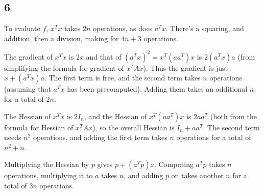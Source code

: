 \documentclass{article}
\begin{document}
\subsection*{6}
To evaluate $f$, $x^Tx$ takes $2n$ operations, as does $a^Tx$. There's a squaring, and addition, then a division, making for $4n+3$ operations.

The gradient of $x^Tx$ is $2x$ and that of $(a^Tx)^2=x^T(aa^T)x$ is $2(a^Tx)a$ (from simplifying the formula for gradient of $x^TAx$). Thus the gradient is just $x+(a^Tx)a$. The first term is free, and the second term takes $n$ operations (assuming that $a^Tx$ has been precomputed). Adding them takes an additional $n$, for a total of $2n$.

The Hessian of $x^Tx$ is $2I_n$, and the Hessian of $x^T(aa^T)x$ is $2aa^T$ (both from the formula for Hessian of $x^TAx$), so the overall Hessian is $I_n+aa^T$. The second term needs $n^2$ operations, and adding the first term takes $n$ operations for a total of $n^2+n$.

Multiplying the Hessian by $p$ gives $p+(a^Tp)a$. Computing $a^Tp$ takes $n$ operations, multiplying it to $a$ takes $n$, and adding $p$ on takes another $n$ for a total of $3n$ operations.
\end{document}
